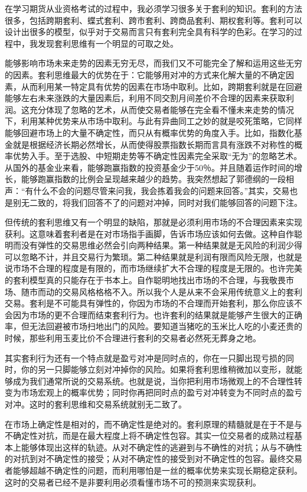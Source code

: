 在学习期货从业资格考试的过程中，我必须学习很多关于套利的知识。套利的方法很多，包括跨期套利、蝶式套利、跨市套利、跨商品套利、期权套利等。套利可以设计出很多的模型，似乎对于交易而言只有套利完全具有科学的色彩。在学习的过程中，我发现套利思维有一个明显的可取之处。

能够影响市场未来走势的因素无穷无尽，而我们又不可能完全了解和运用这些无穷的因素。套利思维最大的优势在于：它能够用对冲的方式来化解大量的不确定因素，从而利用某一特定具有优势的因素在市场中取利。比如，跨期套利就是在回避能够左右未来涨跌的大量因素后，利用不同交割月间差价不合理的因素来获取利润。这充分体现了忽略的艺术，从而使交易者能够在完全看不懂未来走势的情况下，利用某种优势来从市场中取利。与此有异曲同工之妙的就是咬死策略，它同样能够回避市场上的大量不确定性，而只从有概率优势的角度入手。比如，指数化基金就是根据经济长期必然增长，从而使得股票指数长期而言具有涨跌不对称性的概率优势入手。至于选股、中短期走势等不确定性因素完全采取“无为”的忽略艺术。从国外的基金业来看，能够跑赢指数的投资基金少于50％。并且随着运作时间的增长，能够跑赢指数的比例会呈现越来越少的趋势。我突然想起了郭德纲的一段相声：“有什么不会的问题尽管来问我，我会拣着我会的问题来回答。”其实，交易也是别无二致的，将我们回答不了的问题对冲掉，同时对我们能够回答的问题下注。

但传统的套利思维又有一个明显的缺陷，那就是必须利用市场的不合理因素来实现获利。这意味着套利者是在对市场指手画脚，告诉市场应该如何去做。这种自作聪明而没有弹性的交易思维必然会引向两种结果。第一种结果就是无风险的利润少得可以忽略不计，并且交易行为繁琐。第二种结果就是利润有限而风险无限，也就是说市场不合理的程度是有限的，而市场继续扩大不合理的程度是无限的。也许完美的套利模型真的只能存在于书本上。自作聪明地找出市场的不合理，与我敬畏市场、随市而动的交易风格格格不入。所以我个人是从来不会采用传统意义上的套利交易。套利是不可能具有弹性的，你因为市场的不合理而开始套利，那么你应该不会因为市场的更不合理而结束套利行为。也许套利的结果就是能够产生很大的正确率，但无法回避被市场扫地出门的风险。要知道当猪吃的玉米比人吃的小麦还贵的时候，那些利用玉麦比价不合理进行套利的交易者必然死无葬身之地。

其实套利行为还有一个特点就是盈亏对冲是同时点的，你在一只脚出现亏损的同时，你的另一只脚能够立刻对冲掉你的风险。如果将套利思维稍微加以变形，就能够成为我们通常所说的交易系统。也就是说，当你把利用市场微观上的不合理性转变为市场宏观上的概率优势；同时你再把同时点的盈亏对冲转变为不同时点的盈亏对冲。这时的套利思维和交易系统就别无二致了。

在市场上确定性是相对的，而不确定性是绝对的。套利原理的精髓就是在于不是与不确定性对抗，而是在最大程度上将不确定性包容。其实一位交易者的成熟过程基本上能够体现出这样的轨迹。从对不确定性的逃避到与不确性的对抗；从与不确性的对抗到对不确定性的接受；从对不确定性的接受到对不确定性的包容。最终交易者能够超越不确定性的问题，而利用哪怕是一丝的概率优势来实现长期稳定获利。这时的交易者已经不是非要利用必须看懂市场不可的预测来实现获利。

